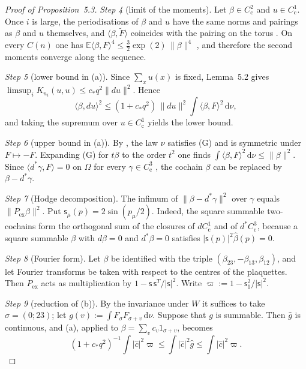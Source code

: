 \documentclass[11pt]{amsart}
\theoremstyle{definition}
\begin{document}
\begin{proof}[Proof of Proposition~5.3]
\emph{Step 4} (limit of the moments).
Let $\beta\in C^2_{\mathrm c}$ and $u\in C^1_{\mathrm c}$.
Once $i$ is large, the periodisations of $\beta$ and $u$ have the same norms and pairings as $\beta$ and $u$ themselves, and $\langle\beta,\widetilde F\rangle$ coincides with the pairing on the torus \cite[Lemma~2.14\,(b)]{QEDII}.
On every $C(n)$ one has $\mathbb E\langle\beta,F\rangle^4\le\frac32\exp(2)\,\|\beta\|^4$ \cite[Theorem~6.27\,(b)]{QEDII}, and therefore the second moments converge along the sequence.

\emph{Step 5} (lower bound in (a)).
Since $\sum_xu(x)$ is fixed, Lemma~5.2 gives $\limsup_iK_{n_i}(u,u)\le c_*q^2\|du\|^2$.
Hence
\begin{equation*}
\langle\beta,du\rangle^2\le(1+c_*q^2)\,\|du\|^2\int\langle\beta,F\rangle^2\,\mathrm d\nu,
\end{equation*}
and taking the supremum over $u\in C^1_{\mathrm c}$ yields the lower bound.

\emph{Step 6} (upper bound in (a)).
By \cite[Theorem~1.2]{QEDII}, the law $\nu$ satisfies (G) and is symmetric under $F\mapsto-F$.
Expanding (G) for $t\beta$ to the order $t^2$ one finds $\int\langle\beta,F\rangle^2\,\mathrm d\nu\le\|\beta\|^2$.
Since $\langle d^*\gamma,F\rangle=0$ on $\Omega$ for every $\gamma\in C^3_{\mathrm c}$ \cite[Lemma~2.14\,(a)]{QEDII}, the cochain $\beta$ can be replaced by $\beta-d^*\gamma$.

\emph{Step 7} (Hodge decomposition).
The infimum of $\|\beta-d^*\gamma\|^2$ over $\gamma$ equals $\|P_{\mathrm{ex}}\beta\|^2$.
Put $\mathsf s_\mu(p)=2\sin(p_\mu/2)$.
Indeed, the square summable two-cochains form the orthogonal sum of the closures of $dC^1_{\mathrm c}$ and of $d^*C^3_{\mathrm c}$, because a square summable $\beta$ with $d\beta=0$ and $d^*\beta=0$ satisfies $|\mathsf s(p)|^2\hat\beta(p)=0$.

\emph{Step 8} (Fourier form).
Let $\beta$ be identified with the triple $(\beta_{23},-\beta_{13},\beta_{12})$, and let Fourier transforms be taken with respect to the centres of the plaquettes.
Then $P_{\mathrm{ex}}$ acts as multiplication by $1-\mathsf s\,\mathsf s^{T}/|\mathsf s|^2$.
Write $\varpi:=1-\mathsf s_1^2/|\mathsf s|^2$.

\emph{Step 9} (reduction of (b)).
By the invariance under $W$ it suffices to take $\sigma=(0;23)$; let $g(v):=\int F_\sigma F_{\sigma+v}\,\mathrm d\nu$.
Suppose that $g$ is summable.
Then $\hat g$ is continuous, and (a), applied to $\beta=\sum_vc_v1_{\sigma+v}$, becomes
\begin{equation*}
(1+c_*q^2)^{-1}\int|\hat c|^2\varpi\le\int|\hat c|^2\hat g\le\int|\hat c|^2\varpi.
\end{equation*}


\end{proof}
\end{document}

